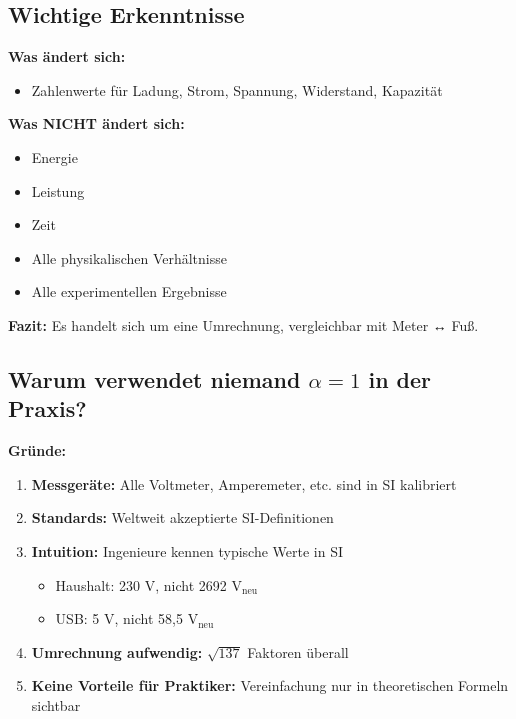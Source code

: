 	\subsection{Wichtige Erkenntnisse}
	
	\begin{tcolorbox}[colback=green!5!white,colframe=green!75!black,title=Kernaussage]
		\textbf{Was ändert sich:}
		\begin{itemize}
			\item Zahlenwerte für Ladung, Strom, Spannung, Widerstand, Kapazität
		\end{itemize}
		
		\textbf{Was NICHT ändert sich:}
		\begin{itemize}
			\item Energie
			\item Leistung
			\item Zeit
			\item Alle physikalischen Verhältnisse
			\item Alle experimentellen Ergebnisse
		\end{itemize}
		
		\textbf{Fazit:} Es handelt sich um eine Umrechnung, vergleichbar mit Meter ↔ Fuß.
	\end{tcolorbox}
	
	\subsection{Warum verwendet niemand $\alpha = 1$ in der Praxis?}
	
	\textbf{Gründe:}
	\begin{enumerate}
		\item \textbf{Messgeräte:} Alle Voltmeter, Amperemeter, etc. sind in SI kalibriert
		
		\item \textbf{Standards:} Weltweit akzeptierte SI-Definitionen
		
		\item \textbf{Intuition:} Ingenieure kennen typische Werte in SI
		\begin{itemize}
			\item Haushalt: 230 V, nicht 2692 V$_{\text{neu}}$
			\item USB: 5 V, nicht 58{,}5 V$_{\text{neu}}$
		\end{itemize}
		\item \textbf{Umrechnung aufwendig:} $\sqrt{137}$ Faktoren überall
		
		\item \textbf{Keine Vorteile für Praktiker:} Vereinfachung nur in theoretischen Formeln sichtbar
	\end{enumerate}
	
